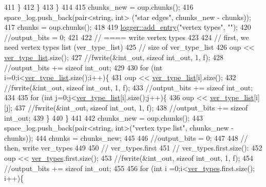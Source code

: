 \begin{DoxyCode}
411       \}
412     \}
413   \}
414   
415   chunks\_new = oup.chunks();
416   space\_log.push\_back(pair<string, int> (\textcolor{stringliteral}{"star edges"}, chunks\_new - chunks));
417   chunks = oup.chunks();
418 
419   \hyperlink{classlogger_a710163deb17bc81f70d53d285b8ac9ac}{logger::add\_entry}(\textcolor{stringliteral}{"vertex types"}, \textcolor{stringliteral}{""});
420   \textcolor{comment}{//output\_bits = 0;}
421   
422   \textcolor{comment}{// ==== write vertex types}
423 
424   \textcolor{comment}{// first, we need vertex types list (ver\_type\_list)}
425   \textcolor{comment}{// size of ver\_type\_list}
426   oup <<  \hyperlink{classmarked__graph__compressed_af2e3e55223d436628a02758dfae88493}{ver\_type\_list}.size();
427   \textcolor{comment}{//fwrite(&int\_out, sizeof int\_out, 1, f);}
428   \textcolor{comment}{//output\_bits += sizeof int\_out;}
429 
430   \textcolor{keywordflow}{for} (\textcolor{keywordtype}{int} i=0;i<\hyperlink{classmarked__graph__compressed_af2e3e55223d436628a02758dfae88493}{ver\_type\_list}.size();i++)\{
431     oup << \hyperlink{classmarked__graph__compressed_af2e3e55223d436628a02758dfae88493}{ver\_type\_list}[i].size();
432     \textcolor{comment}{//fwrite(&int\_out, sizeof int\_out, 1, f);}
433     \textcolor{comment}{//output\_bits += sizeof int\_out;}
434 
435     \textcolor{keywordflow}{for} (\textcolor{keywordtype}{int} j=0;j<\hyperlink{classmarked__graph__compressed_af2e3e55223d436628a02758dfae88493}{ver\_type\_list}[i].size();j++)\{
436       oup << \hyperlink{classmarked__graph__compressed_af2e3e55223d436628a02758dfae88493}{ver\_type\_list}[i][j];
437       \textcolor{comment}{//fwrite(&int\_out, sizeof int\_out, 1, f);}
438       \textcolor{comment}{//output\_bits += sizeof int\_out;}
439     \}
440   \}
441 
442   chunks\_new = oup.chunks();
443   space\_log.push\_back(pair<string, int>(\textcolor{stringliteral}{"vertex type list"}, chunks\_new - chunks));
444   chunks = chunks\_new;
445 
446   \textcolor{comment}{//output\_bits = 0;}
447   
448   \textcolor{comment}{// then, write ver\_types}
449 
450   \textcolor{comment}{// ver\_types.first}
451   \textcolor{comment}{// ver\_types.first.size():}
452   oup << \hyperlink{classmarked__graph__compressed_af446cc5e23c241a92b76642fd5ebc403}{ver\_types}.first.size();
453   \textcolor{comment}{//fwrite(&int\_out, sizeof int\_out, 1, f);}
454   \textcolor{comment}{//output\_bits += sizeof int\_out;}
455 
456   \textcolor{keywordflow}{for} (\textcolor{keywordtype}{int} i =0;i<\hyperlink{classmarked__graph__compressed_af446cc5e23c241a92b76642fd5ebc403}{ver\_types}.first.size(); i++)\{

\end{DoxyCode}
